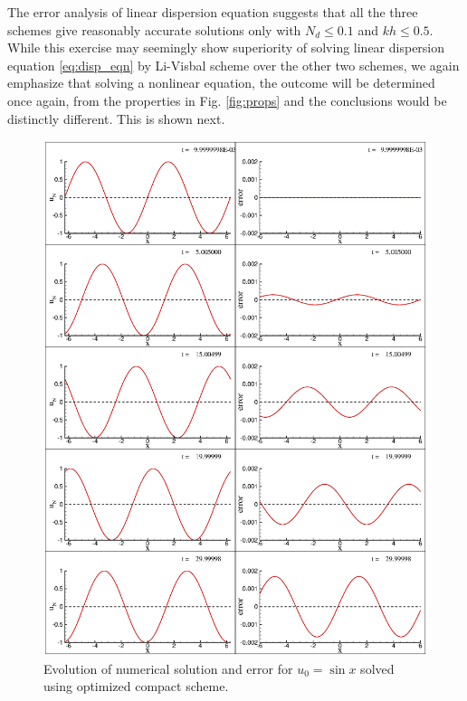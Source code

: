 \documentclass{svjour3}                    %
\begin{document}
The error analysis of linear dispersion equation suggests that all the three schemes give reasonably accurate solutions only with $N_d \leq 0.1$ and $kh \leq 0.5$. While this exercise may seemingly show superiority of solving linear dispersion equation \eqref{eq:disp_eqn} by Li-Visbal scheme over the other two schemes, we again emphasize that solving a nonlinear equation, the outcome will be determined once again, from the properties in Fig. \ref{fig:props} and the conclusions would be distinctly different. This is shown next. 

\begin{figure}[!h]
\center
\includegraphics[width=0.8\linewidth]{Fig_8}
\caption{Evolution of numerical solution and error for $u_0=\sin x$ solved using optimized compact scheme.}
\label{fig:low1}
\end{figure}
\end{document}

